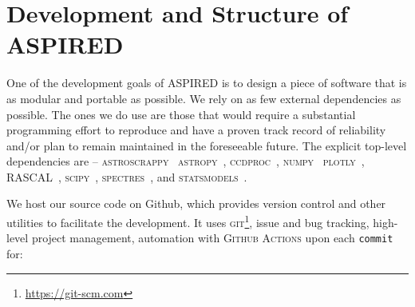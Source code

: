 \documentclass[linenumbers, twocolumn]{aastex631}
\begin{document}
\section{Development and Structure of \textsc{ASPIRED}}
\label{sec:development}

One of the development goals of \textsc{ASPIRED} is to design a piece of software that is as
modular and portable as possible. We rely on as few external dependencies as possible.
The ones we do use are those that would require a substantial programming effort to reproduce and have a
proven track record of reliability and/or plan to remain maintained in the
foreseeable future. The explicit top-level dependencies are --
\textsc{astroscrappy}~\citep{curtis_mccully_2018_1482019, 2001PASP..113.1420V}
\textsc{astropy}~\citep{astropy:2013, astropy:2018},
\textsc{ccdproc}~\citep{matt_craig_2017_1069648},
\textsc{numpy}~\citep{2020NumPy-Array}
\textsc{plotly}~\citep{plotly},
\textsc{RASCAL}~\citep{2020ASPC..527..627V},
\textsc{scipy}~\citep{2020SciPy-NMeth},
\textsc{spectres}~\citep{2017arXiv170505165C}, and
\textsc{statsmodels}~\citep{seabold2010statsmodels}. 

We host our source code on Github, which provides version control and other
utilities to facilitate the development. It uses \textsc{git}\footnote{\url{https://git-scm.com}},
issue and bug tracking, high-level project management, automation with \textsc{Github Actions}
upon each \texttt{commit} for:
\end{document}
